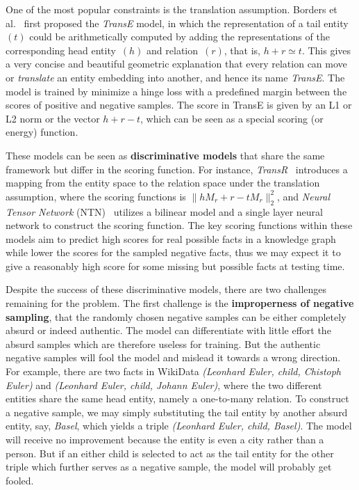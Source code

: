 \documentclass[twocolumn,a4paper,10pt,review,3p]{elsarticle}
\begin{document}

One of the most popular constraints is the translation assumption. Borders et al.~\cite{TransE2013} first proposed the \emph{TransE} model, in which the representation of a tail entity~$(t)$ could be arithmetically computed by adding the representations of the corresponding head entity~$(h)$ and relation~$(r)$, that is, $h + r \simeq t$. This gives a very concise and beautiful geometric explanation that every relation can move or \emph{translate} an entity embedding into another, and hence its name \emph{TransE}.
The model is trained by minimize a hinge loss with a predefined margin between the scores of positive and negative samples. The score in TransE is given by an L1 or L2 norm or the vector $h + r - t$, which can be seen as a special scoring (or energy) function.

These models can be seen as \textbf{discriminative models} that share the same framework but differ in the scoring function. For instance, \emph{TransR}~\cite{TransR2015} introduces a mapping from the entity space to the relation space under the translation assumption, where the scoring functions is $\lVert h M_r + r - t M_r \rVert_2^2 $, and \emph{Neural Tensor Network} (NTN)~\cite{NTN} utilizes a bilinear model and a single layer neural network to construct the scoring function. The key scoring functions within these models aim to predict high scores for real possible facts in a knowledge graph while lower the scores for the sampled negative facts, thus we may expect it to give a reasonably high score for some missing but possible facts at testing time.

Despite the success of these discriminative models, there are two challenges remaining for the problem.
The first challenge is the \textbf{improperness of negative sampling}, that the randomly chosen negative samples can be either completely absurd or indeed authentic.
The model can differentiate with little effort the absurd samples which are therefore useless for training. But the authentic negative samples will fool the model and mislead it towards a wrong direction. For example, there are two facts in WikiData \emph{(Leonhard Euler, child, Chistoph Euler)} and \emph{(Leonhard Euler, child, Johann Euler)}, where the two different entities share the same head entity, namely a one-to-many relation. To construct a negative sample, we may simply substituting the tail entity by another absurd entity, say, \emph{Basel}, which yields a triple \emph{(Leonhard Euler, child, Basel)}. The model will receive no improvement because the entity is even a city rather than a person. But if an either child is selected to act as the tail entity for the other triple which further serves as a negative sample, the model will probably get fooled.
\end{document}
